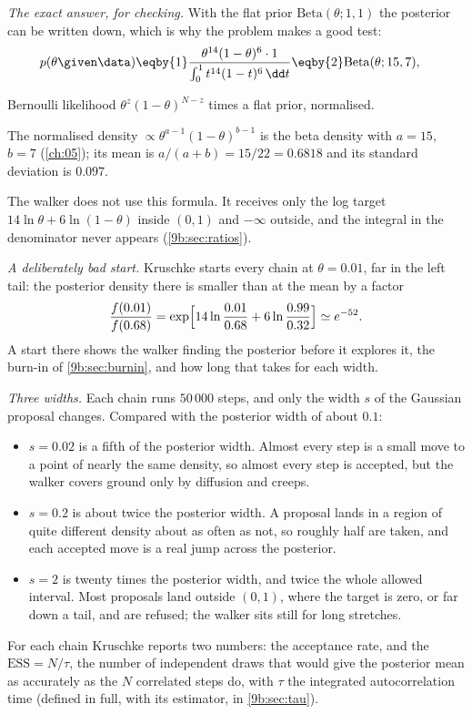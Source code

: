 \emph{The exact answer, for checking.} With the flat prior $\mathrm{Beta}(\theta;1,1)$ the
posterior can be written down, which is why the problem makes a good test:
\begin{align*}
  p(\theta\given\data)
  &\eqby{1}\frac{\theta^{14}(1-\theta)^{6}\cdot1}{\int_0^1t^{14}(1-t)^6\,\dd t}
   \eqby{2}\mathrm{Beta}(\theta;15,7),
\end{align*}
\begin{explain}
  \item Bernoulli likelihood $\theta^z(1-\theta)^{N-z}$ times a flat prior, normalised.
  \item The normalised density $\propto\theta^{a-1}(1-\theta)^{b-1}$ is the beta density with
        $a=15$, $b=7$ (\cref{ch:05}); its mean is $a/(a+b)=15/22=0.6818$ and its standard
        deviation is $0.097$.
\end{explain}
The walker does not use this formula. It receives only the log target $14\ln\theta+6\ln(1-\theta)$
inside $(0,1)$ and $-\infty$ outside, and the integral in the denominator never appears
(\cref{9b:sec:ratios}).

\emph{A deliberately bad start.} Kruschke starts every chain at $\theta=0.01$, far in the left
tail: the posterior density there is smaller than at the mean by a factor
\begin{equation*}
  \frac{f(0.01)}{f(0.68)}=\exp\Bigl[14\ln\frac{0.01}{0.68}+6\ln\frac{0.99}{0.32}\Bigr]\simeq e^{-52}.
\end{equation*}
A start there shows the walker finding the posterior before it explores it, the burn-in of
\cref{9b:sec:burnin}, and how long that takes for each width.

\emph{Three widths.} Each chain runs $50\,000$ steps, and only the width $s$ of the Gaussian
proposal changes. Compared with the posterior width of about $0.1$:
\begin{itemize}[itemsep=1pt]
  \item $s=0.02$ is a fifth of the posterior width. Almost every step is a small move to a point of
        nearly the same density, so almost every step is accepted, but the walker covers ground
        only by diffusion and creeps.
  \item $s=0.2$ is about twice the posterior width. A proposal lands in a region of quite
        different density about as often as not, so roughly half are taken, and each accepted move
        is a real jump across the posterior.
  \item $s=2$ is twenty times the posterior width, and twice the whole allowed interval. Most
        proposals land outside $(0,1)$, where the target is zero, or far down a tail, and are
        refused; the walker sits still for long stretches.
\end{itemize}
For each chain Kruschke reports two numbers: the acceptance rate, and the  $\mathrm{ESS}=N/\tau$, the number of independent draws that would give the posterior
mean as accurately as the $N$ correlated steps do, with $\tau$ the integrated autocorrelation
time (defined in full, with its estimator, in \cref{9b:sec:tau}).


